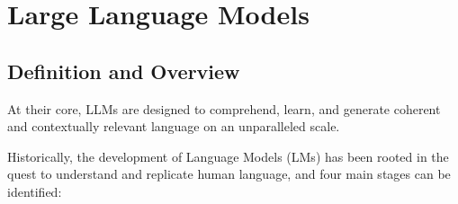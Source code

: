 
\section{Large Language Models}
\label{sec:large-language-models}

\subsection{Definition and Overview}
\label{subsec:definition-and-overview}

At their core, LLMs are designed to comprehend, learn, and generate coherent and contextually relevant language on an unparalleled scale.

Historically, the development of Language Models (LMs) has been rooted in the quest to understand and replicate human language, and four main stages can be identified:

